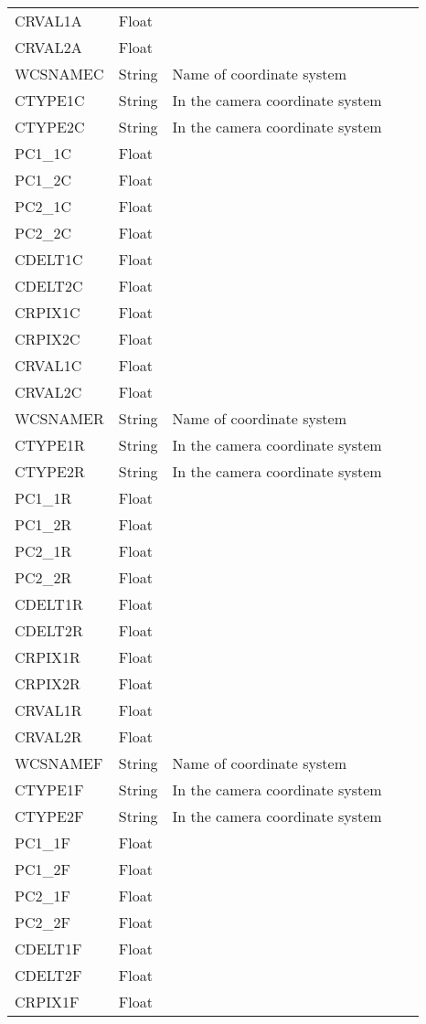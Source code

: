 \begin{longtable}{l l l l l}
CRVAL1A & Float &  \\
CRVAL2A & Float &  \\
WCSNAMEC & String & Name of coordinate system \\
CTYPE1C & String & In the camera coordinate system \\
CTYPE2C & String & In the camera coordinate system \\
PC1\_1C & Float &  \\
PC1\_2C & Float &  \\
PC2\_1C & Float &  \\
PC2\_2C & Float &  \\
CDELT1C & Float &  \\
CDELT2C & Float &  \\
CRPIX1C & Float &  \\
CRPIX2C & Float &  \\
CRVAL1C & Float &  \\
CRVAL2C & Float &  \\
WCSNAMER & String & Name of coordinate system \\
CTYPE1R & String & In the camera coordinate system \\
CTYPE2R & String & In the camera coordinate system \\
PC1\_1R & Float &  \\
PC1\_2R & Float &  \\
PC2\_1R & Float &  \\
PC2\_2R & Float &  \\
CDELT1R & Float &  \\
CDELT2R & Float &  \\
CRPIX1R & Float &  \\
CRPIX2R & Float &  \\
CRVAL1R & Float &  \\
CRVAL2R & Float &  \\
WCSNAMEF & String & Name of coordinate system \\
CTYPE1F & String & In the camera coordinate system \\
CTYPE2F & String & In the camera coordinate system \\
PC1\_1F & Float &  \\
PC1\_2F & Float &  \\
PC2\_1F & Float &  \\
PC2\_2F & Float &  \\
CDELT1F & Float &  \\
CDELT2F & Float &  \\
CRPIX1F & Float &  \\

\end{longtable}

